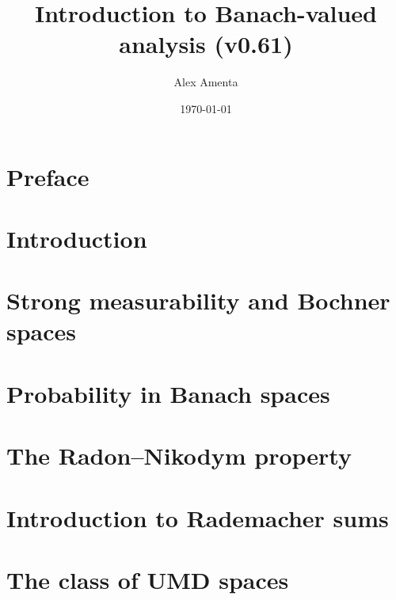 \documentclass[a4paper,10pt]{amsbook}
\begin{document}
\title[Banach-valued analysis]{Introduction to Banach-valued analysis (v0.61)}
\date{\today}

\author[A. Amenta]{Alex Amenta}
\address{\noindent Mathematisches Institut \newline \indent Universit\"at Bonn, Bonn, Germany}

\maketitle
\tableofcontents


\chapter*{Preface}


\chapter{Introduction}
\label{sec:intro}


\chapter{Strong measurability and Bochner spaces}
\label{sec:Bochner-spaces}


\chapter{Probability in Banach spaces}
\label{sec:martingales} 


\chapter{The Radon--Nikodym property}
\label{sec:RNP}


\chapter{Introduction to Rademacher sums}
\label{sec:rademacher}


\chapter{The class of UMD spaces}
\label{sec:UMD}

\end{document}
